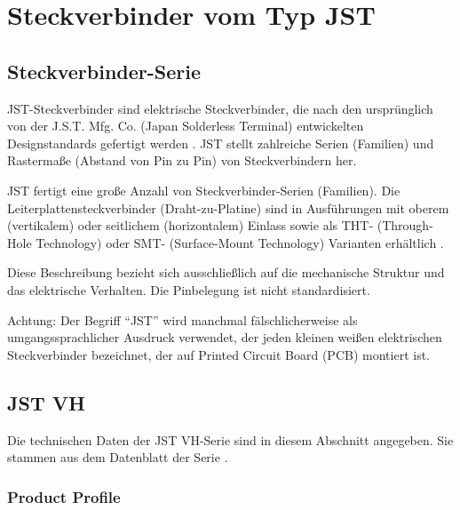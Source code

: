 %
%
%

\chapter{Steckverbinder vom Typ JST}


\section{Steckverbinder-Serie}

JST-Steckverbinder sind elektrische Steckverbinder, die nach den ursprünglich von der J.S.T. Mfg. Co. (Japan Solderless Terminal) entwickelten Designstandards gefertigt werden \cite{JST:2016}. JST stellt zahlreiche Serien (Familien) und Rasterma\ss e (Abstand von Pin zu Pin) von Steckverbindern her.


JST fertigt eine große Anzahl von Steckverbinder-Serien (Familien). Die Leiterplattensteckverbinder (Draht-zu-Platine) sind in Ausführungen mit oberem (vertikalem) oder seitlichem (horizontalem) Einlass sowie als THT- (Through-Hole Technology) oder SMT- (Surface-Mount Technology) Varianten erhältlich \cite{JST:2020}. 

Diese Beschreibung bezieht sich ausschließlich auf die mechanische Struktur und das elektrische Verhalten. Die Pinbelegung ist nicht standardisiert.

Achtung: Der Begriff ``JST'' wird manchmal fälschlicherweise als umgangssprachlicher Ausdruck verwendet, der jeden kleinen wei\ss en elektrischen Steckverbinder bezeichnet, der auf Printed Circuit Board (PCB) montiert ist.




\section{JST VH}


Die technischen Daten der JST VH-Serie sind in diesem Abschnitt angegeben. Sie stammen aus dem Datenblatt der Serie \cite{JST:2021}. 

\subsection{Product Profile}


